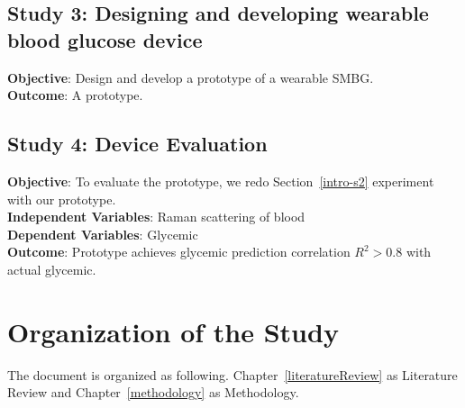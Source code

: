 \subsection{Study 3: Designing and developing wearable blood glucose device}

\textbf{Objective}: Design and develop a prototype of a wearable SMBG.\\
\textbf{Outcome}: A prototype.




\subsection{Study 4: Device Evaluation}

\textbf{Objective}: To evaluate the prototype, we redo Section~\ref{intro-s2} experiment with our prototype.\\
\textbf{Independent Variables}: Raman scattering of blood\\
\textbf{Dependent Variables}: Glycemic\\
\textbf{Outcome}: Prototype achieves glycemic prediction correlation $R^2 > 0.8$ with actual glycemic.




\section{Organization of the Study}

The document is organized as following. Chapter~\ref{literatureReview} as Literature Review and Chapter~\ref{methodology} as Methodology.